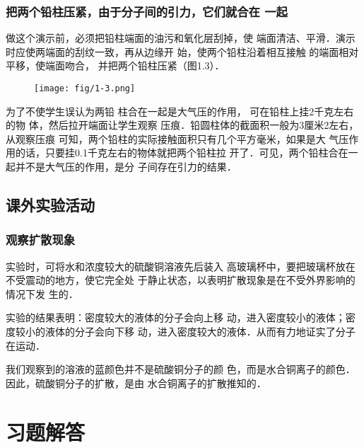 \subsubsection{把两个铅柱压紧，由于分子间的引力，它们就合在
一起}

做这个演示前，必须把铅柱端面的油污和氧化层刮掉，使
端面清洁、平滑．演示时应使两端面的刮纹一致，再从边缘开
始，使两个铅柱沿着相互接触
的端面相对平移，使端面吻合，
并把两个铅柱压紧（图1.3）．
\begin{figure}[htp]\centering
    \centering
    \texttt{[image: fig/1-3.png]}
    \caption{}
    \end{figure}

为了不使学生误认为两铅
柱合在一起是大气压的作用，
可在铅柱上挂2千克左右的物
体，然后拉开端面让学生观察
压痕．铅圆柱体的截面积一般为3厘米2左右，从观察压痕
可知，两个铅柱的实际接触面积只有几个平方毫米，如果是大
气压作用的话，只要挂0.1千克左右的物体就把两个铅柱拉
开了．可见，两个铅柱合在一起并不是大气压的作用，是分
子间存在引力的结果．

\subsection{课外实验活动}
\subsubsection{观察扩散现象}

实验时，可将水和浓度较大的硫酸铜溶液先后装入
高玻璃杯中，要把玻璃杯放在不受震动的地方，使它完全处
于静止状态，以表明扩散现象是在不受外界影响的情况下发
生的．

实验的结果表明：密度较大的液体的分子会向上移
动，进入密度较小的液体；密度较小的液体的分子会向下移
动，进入密度较大的液体．从而有力地证实了分子在运动．

我们观察到的溶液的蓝颜色并不是硫酸铜分子的颜
色，而是水合铜离子的颜色．因此，硫酸铜分子的扩散，是由
水合铜离子的扩散推知的．

\section{习题解答}
